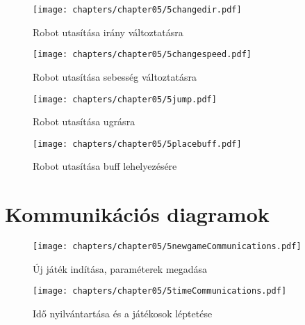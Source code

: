 \begin{figure}[h]
    \begin{center}
        \texttt{[image: chapters/chapter05/5changedir.pdf]}
        \caption{Robot utasítása irány változtatásra}
        \label{fig:5changedir}
    \end{center}
\end{figure}
\clearpage

\begin{figure}[h]
    \begin{center}
        \texttt{[image: chapters/chapter05/5changespeed.pdf]}
        \caption{Robot utasítása sebesség változtatásra}
        \label{fig:5changespeed}
    \end{center}
\end{figure}
\clearpage

\begin{figure}[h]
    \begin{center}
        \texttt{[image: chapters/chapter05/5jump.pdf]}
        \caption{Robot utasítása ugrásra}
        \label{fig:5jump}
    \end{center}
\end{figure}
\clearpage

\begin{figure}[h]
    \begin{center}
        \texttt{[image: chapters/chapter05/5placebuff.pdf]}
        \caption{Robot utasítása buff lehelyezésére}
        \label{fig:5placebuff}
    \end{center}
\end{figure}
\clearpage

\section{Kommunikációs diagramok}


\begin{figure}[h]
	\begin{center}
		\texttt{[image: chapters/chapter05/5newgameCommunications.pdf]}
		\caption{Új játék indítása, paraméterek megadása}
		\label{fig:5newgameCommunication}
	\end{center}
\end{figure}

\begin{figure}[h]
	\begin{center}
		\texttt{[image: chapters/chapter05/5timeCommunications.pdf]}
		\caption{Idő nyilvántartása és a játékosok léptetése}
		\label{fig:5timeCommunication}
	\end{center}
\end{figure}

